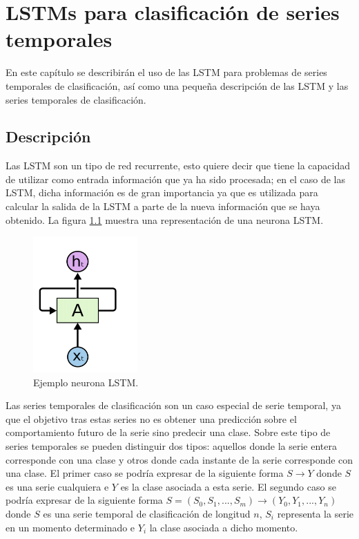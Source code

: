 \chapter{LSTMs para clasificación de series temporales}
En este capítulo se describirán el uso de las LSTM para problemas de series temporales de clasificación, así como una pequeña descripción de las LSTM y las series temporales de clasificación.
\section{Descripción}
Las LSTM son un tipo de red recurrente, esto quiere decir que tiene la capacidad de utilizar como entrada información que ya ha sido procesada; en el caso de las LSTM, dicha información es de gran importancia ya que es utilizada para calcular la salida de la LSTM a parte de la nueva información que se haya obtenido. La figura \ref{fig:31} muestra una representación de una neurona LSTM.\newline

\begin{figure}[h]
	\centering
	\includegraphics[width=40mm]{imagenes/lstm_basico.png}
	\caption{Ejemplo neurona LSTM.}
	\label{fig:31}
\end{figure}
\verticalspace

Las series temporales de clasificación son un caso especial de serie temporal, ya que el objetivo tras estas series no es obtener una predicción sobre el comportamiento futuro de la serie sino predecir una clase. Sobre este tipo de series temporales se pueden distinguir dos tipos: aquellos donde la serie entera corresponde con una clase y otros donde cada instante de la serie corresponde con una clase. El primer caso se podría expresar de la siguiente forma $ S \rightarrow Y $ donde $S$  es una serie cualquiera e $Y$ es la clase asociada a esta serie. El segundo caso se podría expresar de la siguiente forma $ S = (S_0, S_1,..., S_m) \rightarrow (Y_0,Y_1,..., Y_n) $ donde $S$ es una serie temporal de clasificación de longitud $n$, $S_i$ representa la serie en un momento determinado e $Y_i$ la clase asociada a dicho momento.\newline

